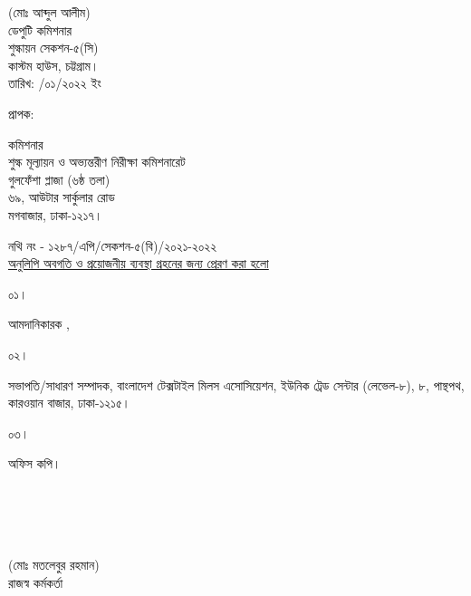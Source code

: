 \documentclass[12pt]{article}
\newcommand{\fileno}{নথি নং - ১২৮৭/এপি/সেকশন-৫(বি)/২০২১-২০২২}
\newcommand{\impn}{\jdwl}
\newcommand{\impadd}{\jdwla}
\newcommand{\rodt}{তারিখ: \hspace{2.0em}/০১/২০২২ ইং}
\begin{document}
\begin{minipage}[t]{0.60\linewidth}
\hspace{1em}
\end{minipage}
\begin{minipage}[t]{0.40\linewidth}
\begin{center}
(মোঃ আব্দুল আলীম)
\\
ডেপুটি কমিশনার
\\
শুল্কায়ন সেকশন-৫(সি)
\\
কাস্টম হাউস, চট্টগ্রাম।
\\
\footnotesize{{\rodt}}
\vspace*{5MM}
\end{center}
\end{minipage}
\begin{minipage}[t]{.07\linewidth}
প্রাপক:
\end{minipage}
\begin{minipage}[t]{.93\linewidth}
কমিশনার
\\
শুল্ক মূল্যায়ন ও অভ্যন্তরীণ নিরীক্ষা কমিশনারেট
\\
গুলফেঁশা প্লাজা (৬ষ্ঠ তলা)
\\
৬৯, আউটার সার্কুলার রোড
\\
মগবাজার, ঢাকা-১২১৭।
\\
\end{minipage}
\footnotesize{{\fileno}}
\\
\underline{\footnotesize{অনুলিপি অবগতি ও প্রয়োজনীয় ব্যবস্থা গ্রহনের জন্য প্রেরণ করা হলো}}
\\
\begin{minipage}[t]{0.06\linewidth}
\footnotesize{০১।}
\end{minipage}
\begin{minipage}[t]{0.94\linewidth}
\footnotesize{
আমদানিকারক {\impn}, {\impadd}
}
\end{minipage}
\begin{minipage}[t]{0.06\linewidth}
\footnotesize{০২।}
\end{minipage}
\begin{minipage}[t]{0.94\linewidth}
সভাপতি/সাধারণ সম্পাদক, বাংলাদেশ টেক্সটাইল
মিলস এসোসিয়েশন, ইউনিক ট্রেড সেন্টার (লেভেল-৮),
৮, পান্থপথ, কারওয়ান বাজার, ঢাকা-১২১৫।
\end{minipage}
\begin{minipage}[t]{0.06\linewidth}
\footnotesize{০৩।}
\end{minipage}
\begin{minipage}[t]{0.94\linewidth}
 অফিস কপি।
 \\
 \\
 \\
 \\
 \\
\end{minipage}
\begin{minipage}[t]{0.60\linewidth}
\hspace{1em}
\end{minipage}
\normalsize
\begin{minipage}[t]{0.40\linewidth}
\begin{center}
(মোঃ মতলেবুর রহমান)
\\
রাজস্ব কর্মকর্তা
\end{center}
\end{minipage}
\thispagestyle{slogan}
\end{document}
